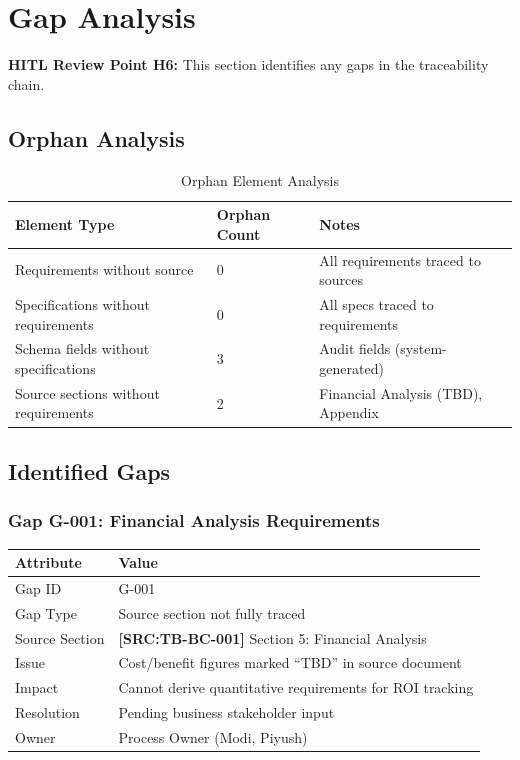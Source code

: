 \documentclass[11pt,a4paper]{article}
\newcommand{\srcref}[1]{\textcolor{sourcegreen}{\textbf{[SRC:#1]}}}
\begin{document}

\newpage
\section{Gap Analysis}

\textbf{HITL Review Point H6:} This section identifies any gaps in the traceability chain.

\subsection{Orphan Analysis}

\begin{table}[h]
\centering
\caption{Orphan Element Analysis}
\begin{tabular}{@{}L{4cm}L{5cm}L{5cm}@{}}
\toprule
\textbf{Element Type} & \textbf{Orphan Count} & \textbf{Notes} \\
\midrule
Requirements without source & 0 & All requirements traced to sources \\
Specifications without requirements & 0 & All specs traced to requirements \\
Schema fields without specifications & 3 & Audit fields (system-generated) \\
Source sections without requirements & 2 & Financial Analysis (TBD), Appendix \\
\bottomrule
\end{tabular}
\end{table}

\subsection{Identified Gaps}

\subsubsection{Gap G-001: Financial Analysis Requirements}

\begin{table}[h]
\centering
\begin{tabular}{@{}L{4cm}L{10cm}@{}}
\toprule
\textbf{Attribute} & \textbf{Value} \\
\midrule
Gap ID & G-001 \\
Gap Type & Source section not fully traced \\
Source Section & \srcref{TB-BC-001} Section 5: Financial Analysis \\
Issue & Cost/benefit figures marked ``TBD'' in source document \\
Impact & Cannot derive quantitative requirements for ROI tracking \\
Resolution & Pending business stakeholder input \\
Owner & Process Owner (Modi, Piyush) \\
\bottomrule
\end{tabular}
\end{table}
\end{document}
